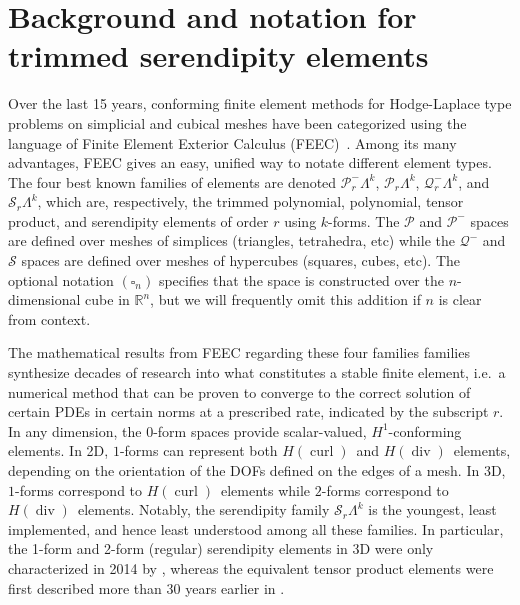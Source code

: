 \documentclass[format=acmsmall,screen,timestamp=false,a4paper]{acmart}
\DeclareMathOperator{\Div}{div}
\DeclareMathOperator{\curl}{curl}
\newcommand{\R}{\mathbb{R}}
\newcommand{\calP}{\mathcal{P}}
\newcommand{\calQ}{\mathcal{Q}}
\newcommand{\calS}{\mathcal{S}}
\newcommand{\hcurl}{\ensuremath{{H}(\curl)}\xspace}
\newcommand{\hdiv}{\ensuremath{{H}(\Div)}\xspace}
\begin{document}
  
  
\section{Background and notation for trimmed serendipity elements}
   
    Over the last 15 years, conforming finite element methods for Hodge-Laplace type problems on simplicial and cubical meshes have been categorized using the language of Finite Element Exterior Calculus (FEEC)~\cite{AFW2006,AFW2010,ABB2012}.  Among its many advantages, FEEC gives an easy, unified way to notate different element types.  The four best known families of elements are denoted $\calP^-_r \Lambda^k$, $\calP_r \Lambda^k$, $\calQ^-_r \Lambda^k$, and $\calS_r \Lambda^k$, which are, respectively, the trimmed polynomial, polynomial, tensor product, and serendipity elements of order $r$ using $k$-forms.  The $\calP$ and $\calP^-$ spaces are defined over meshes of simplices (triangles, tetrahedra, etc) while the $\calQ^-$ and $\calS$ spaces are defined over meshes of hypercubes (squares, cubes, etc). The optional notation $(\square_n)$ specifies that the space is constructed over the $n$-dimensional cube in $\R^n$, but we will frequently omit this addition if $n$ is clear from context.
    
    The mathematical results from FEEC regarding these four families families synthesize decades of research into what constitutes a stable finite element, i.e.\ a numerical method that can be proven to converge to the correct solution of certain PDEs in certain norms at a prescribed rate, indicated by the subscript $r$.  In any dimension, the $0$-form spaces provide scalar-valued, $H^1$-conforming elements.  In 2D, $1$-forms can represent both \hcurl~and \hdiv~elements, depending on the orientation of the DOFs defined on the edges of a mesh.  In 3D, $1$-forms correspond to \hcurl~elements while $2$-forms correspond to \hdiv~elements.  Notably, the serendipity family $\calS_r\Lambda^k$ is the youngest, least implemented, and hence least understood among all these families.  In particular, the 1-form and 2-form (regular) serendipity elements in 3D were only characterized in 2014 by \citet{arnold2014finite}, whereas the equivalent tensor product elements were first described more than 30 years earlier in \citet{N1980,N1986}.
 
\end{document}
